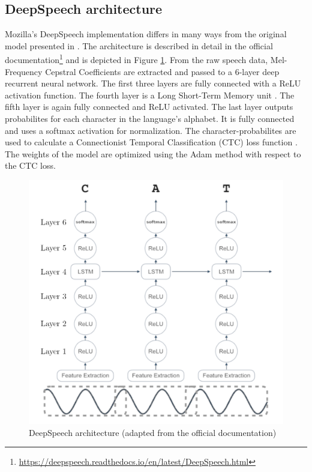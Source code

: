 \documentclass[12pt]{article}    %
\begin{document}
\subsection{DeepSpeech architecture}
Mozilla's DeepSpeech implementation differs in many ways from the original model presented in \parencite{hannun2014deep}. The architecture is described in detail in the official documentation\footnote{\url{https://deepspeech.readthedocs.io/en/latest/DeepSpeech.html}} and is depicted in Figure \ref{fig:ds}. From the raw speech data, Mel-Frequency Cepstral Coefficients \parencite{imai1983cepstral} are extracted and passed to a 6-layer deep recurrent neural network. The first three layers are fully connected with a ReLU activation function. The fourth layer is a Long Short-Term Memory unit \parencite{hochreiter1997long}. The fifth layer is again fully connected and ReLU activated. The last layer outputs probabilites for each character in the language's alphabet. It is fully connected and uses a softmax activation for normalization. The character-probabilites are used to calculate a Connectionist Temporal Classification (CTC) loss function \parencite{graves2006connectionist}. The weights of the model are optimized using the Adam method \parencite{kingma2014adam} with respect to the CTC loss.

\begin{figure}[ht]
    \centering
    \includegraphics[width=.85\textwidth]{ds.png}
    \caption{DeepSpeech architecture (adapted from the official documentation\protect\footnotemark[\value{footnote}])}
    \label{fig:ds}
\end{figure}
\end{document}
